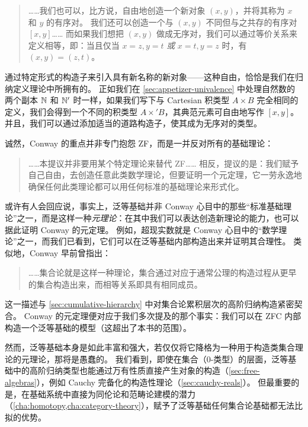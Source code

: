 \begin{quote}\footnotesize
  ……我们也可以，比方说，自由地创造一个新对象 $(x,y)$，并将其称为 $x$ 和 $y$ 的有序对。
  我们还可以创造一个与 $(x,y)$ 不同但与之共存的有序对 $[x,y]$……
  而如果我们想把 $(x,y)$ 做成无序对，我们可以通过等价关系来定义相等，即：当且仅当 $x=z,y=t$ \emph{或} $x=t,y=z$ 时，有 $(x,y)=(z,t)$。
\end{quote}

通过特定形式的构造子来引入具有新名称的新对象——这种自由，恰恰是我们在归纳定义理论中所拥有的。
正如我们在 \cref{sec:appetizer-univalence} 中处理自然数的两个副本 $\mathbb{N}$ 和 $\mathbb{N}'$ 时一样，如果我们写下与 Cartesian 积类型 $A\times B$ 完全相同的定义，我们会得到一个不同的积类型 $A\times' B$，其典范元素可自由地写作 $[x,y]$。
并且，我们可以通过添加适当的道路构造子，使其成为无序对的类型。%

诚然，Conway 的重点并非专门抱怨 ZF，而是一并反对所有的基础理论：

\begin{quote}\footnotesize
  ……本提议并非要用某个特定理论来替代 ZF……
  相反，提议的是：我们赋予自己自由，去创造任意此类数学理论，但要证明一个元定理，它一劳永逸地确保任何此类理论都可以用任何标准的基础理论来形式化。
\end{quote}

或许有人会回应说，事实上，泛等基础并非 Conway 心目中的那些``标准基础理论''之一，而是这样一种\emph{元理论}：在其中我们可以表达创造新理论的能力，也可以据此证明 Conway 的元定理。
例如，超现实数就是 Conway 心目中的``数学理论''之一，而我们已看到，它们可以在泛等基础内部构造出来并证明其合理性。
类似地，Conway 早前曾指出：

\begin{quote}\footnotesize
  ……集合论就是这样一种理论，集合通过对应于通常公理的构造过程从更早的集合构造出来，而相等关系即具有相同成员。
\end{quote}

这一描述与 \cref{sec:cumulative-hierarchy} 中对集合论累积层次的高阶归纳构造紧密契合。
Conway 的元定理便对应于我们多次提及的那个事实：我们可以在 ZFC 内部构造一个泛等基础的模型（这超出了本书的范围）。

然而，泛等基础本身是如此丰富和强大，若仅仅将它降格为一种用于构造类集合理论的元理论，那将是愚蠢的。
我们看到，即使在集合（0-类型）的层面，泛等基础中的高阶归纳类型也能通过万有性质直接产生对象的构造（\cref{sec:free-algebras}），例如 Cauchy 完备化的构造性理论（\cref{sec:cauchy-reals}）。
但最重要的是，在基础系统中直接为同伦论和范畴论建模的潜力（\cref{cha:homotopy,cha:category-theory}），赋予了泛等基础任何集合论基础都无法比拟的优势。
%

